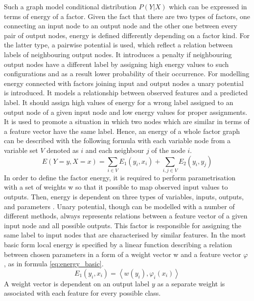 Such a graph model conditional distribution $P(Y|X)$ which can be expressed in terms of energy of a factor. Given the fact that there are two types of factors, one connecting an input node to an output node and the other one between every pair of output nodes, energy is defined differently depending on a factor kind. For the latter type, a pairwise potential is used, which reflect a relation between labels of neighbouring output nodes. It introduces a penalty if neighbouring output nodes have a different label by assigning high energy values to such configurations and as a result lower probability of their occurrence. For modelling energy connected with factors joining input and output nodes a unary potential is introduced. It models a relationship between observed features and a predicted label. It should assign high values of energy for a wrong label assigned to an output node of a given input node and low energy values for proper assignments. It is used to promote a situation in which two nodes which are similar in terms of a feature vector have the same label. Hence, an energy of a whole factor graph can be described with the following formula with each variable node from a variable set $V$ denoted as $i$ and each neighbour $j$ of the node $i$.
\begin{equation}
    E(Y=y,X=x)=\sum_{i\in V}{E_1}({y_i},{x_i}) + \sum_{i,j\in V}{E_2}({y_i},{y_j})
\end{equation}
In order to define the factor energy, it is required to perform parametrisation with a set of weights w so that it possible to map observed input values to outputs. Then, energy is dependent on three types of variables, inputs, outputs, and parameters \cite{inference_crf}. Unary potential, though can be modelled with a number of different methods, always represents relations between a feature vector of a given input node and all possible outputs. This factor is responsible for assigning the same label to input nodes that are characterised by similar features. In the most basic form local energy is specified by a linear function describing a relation between chosen parameters in a form of a weight vector w and a feature vector $\varphi$ \cite{Nowozin}, as in formula \ref{eq:energy_basic}.
\begin{equation}
    \label{eq:energy_basic}
    E_1(y_i,x_i)=\left \langle w(y_i),\varphi_i(x_i) \right \rangle
\end{equation}
A weight vector is dependent on an output label $y$ as a separate weight is associated with each feature for every possible class.

